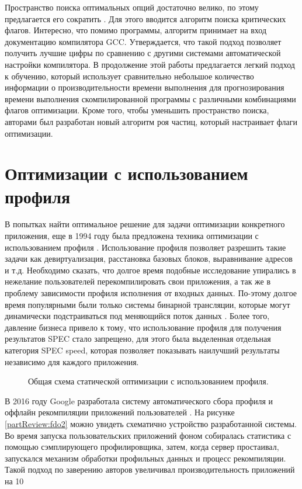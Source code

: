Пространство поиска оптимальных опций достаточно велико, по этому предлагается его сократить \cite{zhu2023compiler}. Для этого вводится алгоритм поиска критических флагов. Интересно, что помимо программы, алгоритм принимает на вход документацию компилятора GCC. Утверждается, что такой подход позволяет получить лучшие цифры по сравнению с другими системами автоматической настройки компилятора.  В продолжение этой работы \cite{zhu2024compiler} предлагается легкий подход к обучению, который использует сравнительно небольшое количество информации о производительности времени выполнения для прогнозирования времени выполнения скомпилированной программы с различными комбинациями флагов оптимизации. Кроме того, чтобы уменьшить пространство поиска, авторами был разработан новый алгоритм роя частиц, который настраивает флаги оптимизации.


\section{Оптимизации с использованием профиля} \label{pr:pgo}
В попытках  найти оптимальное решение для задачи оптимизации конкретного приложения, еще в 1994 году была предложена техника оптимизации с использованием профиля \cite{liew1994feedback}. Использование профиля позволяет разрешить такие задачи как девиртуализация, расстановка базовых блоков, выравнивание адресов и т.д. Необходимо сказать, что долгое время подобные исследование упирались в нежелание пользователей перекомпилировать свои приложения, а так же в проблему зависимости профиля исполнения от входных данных. По-этому долгое  время популярными были только системы бинарной трансляции, которые могут динамически подстраиваться под меняющийся поток данных \cite{dange2014systematic}. Более того, давление бизнеса привело к тому, что использование профиля для получения результатов SPEC стало запрещено, для этого была выделенная отдельная категория SPEC speed, которая позволяет показывать наилучший результаты независимо для каждого приложения.
 \begin{figure}[htbp]
	\centering
	
	\caption{Общая схема статической оптимизации с использованием профиля.}
	\label{partReview:fdo1}
\end{figure}

В 2016 году Google разработала систему автоматического сбора профиля и оффлайн рекомпиляции приложений пользователей \cite{chen2016autofdo}. На рисунке \ref{partReview:fdo2} можно увидеть схематично устройство разработанной системы. Во время запуска пользовательских приложений фоном собиралась статистика с помощью сэмплирующего профилировщика, затем, когда сервер простаивал, запускался механизм обработки профильных данных и процесс рекомпиляции. Такой подход по заверению авторов увеличивал производительность приложений на 10%

